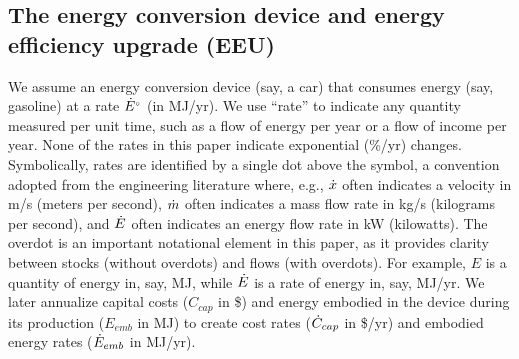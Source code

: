 \documentclass[12pt]{article}\usepackage[]{graphicx}\usepackage[]{xcolor}
\begin{document}
\subsection{The energy conversion device and energy efficiency upgrade (EEU)}
\label{sec:ecd_and_eeu}

We assume an energy conversion device (say, a car)
that consumes energy
(say, gasoline) at a rate ${}{\dot{E}}^{\scriptscriptstyle \circ}$ (in MJ/yr).
We use ``rate'' to indicate any quantity measured per unit time, 
such as a flow of energy per year or a flow of income per year.
None of the rates in this paper indicate exponential (\%/yr) changes.
Symbolically, rates are identified by a single dot above the symbol,
a convention adopted from the engineering literature where, e.g.,
$\dot{x}$ often indicates a velocity in m/s (meters per second), 
$\dot{m}$ often indicates a mass flow rate in kg/s (kilograms per second), and
$\dot{E}$ often indicates an energy flow rate in kW (kilowatts).
The overdot is an important notational element in this paper, 
as it provides clarity between stocks (without overdots)
and flows (with overdots). 
For example,  
$E$ is a quantity of energy in, say, MJ, while
$\dot{E}$ is a rate of energy in, say, MJ/yr.
We later annualize capital costs ($C_{cap}$ in \$) and
energy embodied in the device during
its production ($E_{emb}$ in MJ) to create
cost rates ($\dot{C}_{cap}$ in \$/yr) and
embodied energy rates ($\dot{E}_{emb}$ in MJ/yr).
\end{document}
